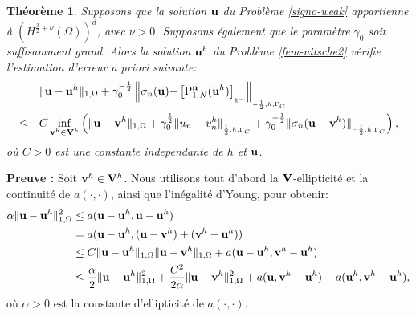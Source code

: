 \documentclass[11pt]{book}
\newtheorem{theorem}{Théorème}[section]
\newcommand{\bt}{\begin{theorem}}
\newcommand{\et}{\end{theorem}}
\newcommand{\pf}{\textbf{Preuve : }}
\def\u{{\bf u}}
\def\t{{\bf t}}
\def\n{{\bf n}}
\def\vv{{\bf v}}
\def\V{{\bf V}}
\newcommand{\caI}{{\cal I}}
\newcommand{\ds}{\displaystyle}
\newcommand{\R}{\mathbb{R}}
\newcommand{\Gc}{\Gamma_{C}}
\newcommand{\dg}{d\Gamma}
\newcommand{\igc}{{\ds\int_{\Gc}\hspace*{-0.7em}}}
\newcommand{\bs}{\mbox{\boldmath{$\sigma$}}}
\newcommand{\sn}{{\sigma_n}}
\newcommand{\Pgh}{P_{\gamma}}
\newcommand{\PTgh}{\mathbf{P}^{\t}_{1, \gamma}}
\newcommand{\PNgh}{\mathrm{P}^{\n}_{1, N}}
\newcommand{\nngc}[1]{\|{#1}\|_{_{-\frac12,h,\Gc}}}
\newcommand{\Nngc}[1]{\left \|{#1} \right \|_{_{-\frac12,h,\Gc}}}
\newcommand{\npgc}[1]{\|{#1}\|_{_{\frac12,h,\Gc}}}
\newcommand{\pn}[1]{\left [ #1 \right ]_{_{\R^-}}}
\begin{document}
\bt
\label{cvnitsche}
Supposons que la solution $\u$ du Problème \eqref{signo-weak} appartienne à
$(H^{\frac32+\nu} (\Omega))^d$, avec $\nu >0$.
Supposons également que le paramètre $\gamma_0$ soit suffisamment grand.
Alors la solution $\u^h$ 
du Problème \eqref{fem-nitsche2}
vérifie l'estimation d'erreur a priori suivante:
\begin{align}
\label{cvnitsche1}
\begin{aligned}
& \| \u - \u^h \|_{1,\Omega}
 +
\gamma_0^{-\frac12} %
\Nngc{\sn(\u) {- \pn{\PNgh (\u^h)}} }
\\
 \leq \quad 
& C \inf_{\vv^h \in \V^h} \left (
  \| \u - \vv^h\|_{1,\Omega} + 
 \gamma_0^{\frac12}  \npgc{ u_n-v_n^h } +
 \gamma_0^{-\frac12} \nngc{ \sigma_n (\u - \vv^h)  }
  \right ),
% 
%   
\end{aligned}
\end{align}
où $C > 0$ est une constante independante de $h$ et $\u$.
\et

\pf
Soit $\vv^h \in \V^h$. Nous utilisons tout d'abord 
la $\V$-ellipticité et la continuité de $a(\cdot,\cdot)$, ainsi que l'inégalité d'Young, pour obtenir:
\begin{align}
\alpha \| \u - \u^h \|^2_{1,\Omega} &
\leq a ( \u - \u^h , \u - \u^h ) \nonumber \\
& =  a ( \u - \u^h , (\u - \vv^h) + (\vv^h - \u^h) ) \nonumber \\
& \leq C \| \u - \u^h \|_{1,\Omega} \| \u - \vv^h \|_{1,\Omega}
+ a ( \u - \u^h , \vv^h - \u^h ) \nonumber \\
& \leq \frac\alpha2 \| \u - \u^h \|^2_{1,\Omega}
+ \frac{C^2}{2\alpha} \| \u - \vv^h \|^2_{1,\Omega}
+ a ( \u  , \vv^h - \u^h )
- a ( \u^h , \vv^h - \u^h ), \label{cvdem1a}
\end{align}
où $\alpha > 0$ est la constante d'ellipticité de $a(\cdot,\cdot)$. 
\end{document}
